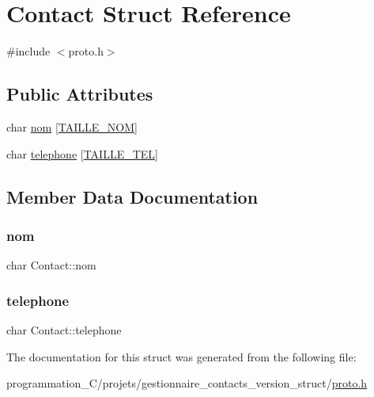 \hypertarget{structContact}{}\section{Contact Struct Reference}
\label{structContact}


{\ttfamily \#include $<$proto.\+h$>$}

\subsection*{Public Attributes}
\begin{DoxyCompactItemize}
\item 
char \hyperlink{structContact_afb8403a88cd1e72375184006e9e8f77e}{nom} \mbox{[}\hyperlink{version__struct__fichier_2proto_8h_a967232a261ff7f17c1010e6fc27270a0}{T\+A\+I\+L\+L\+E\+\_\+\+N\+OM}\mbox{]}
\item 
char \hyperlink{structContact_ad3491136a3ebd9199c7e83353a6d7d33}{telephone} \mbox{[}\hyperlink{version__struct__fichier_2proto_8h_a06314783d85805a92d1da346eb4bc1d4}{T\+A\+I\+L\+L\+E\+\_\+\+T\+EL}\mbox{]}
\end{DoxyCompactItemize}


\subsection{Member Data Documentation}
\mbox{\label{structContact_afb8403a88cd1e72375184006e9e8f77e}} 
\subsubsection{\texorpdfstring{nom}{nom}}
{\footnotesize\ttfamily char Contact\+::nom}

\mbox{\label{structContact_ad3491136a3ebd9199c7e83353a6d7d33}} 
\subsubsection{\texorpdfstring{telephone}{telephone}}
{\footnotesize\ttfamily char Contact\+::telephone}



The documentation for this struct was generated from the following file\+:\begin{DoxyCompactItemize}
\item 
programmation\+\_\+\+C/projets/gestionnaire\+\_\+contacts\+\_\+version\+\_\+struct/\hyperlink{version__struct_2proto_8h}{proto.\+h}\end{DoxyCompactItemize}
